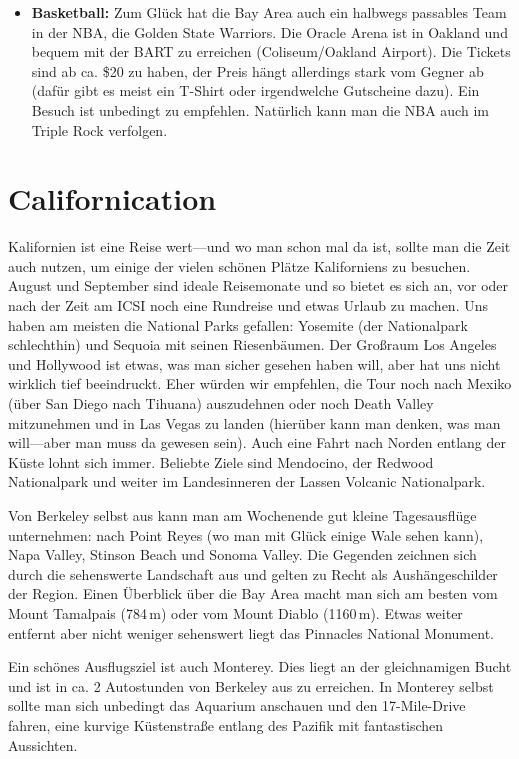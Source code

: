 \documentclass[a4paper]{scrreprt}
\begin{document}
\begin{itemize}
	\item \textbf{Basketball:} Zum Glück hat die Bay Area auch ein halbwegs passables Team in der NBA, die Golden State Warriors. Die Oracle Arena ist in Oakland und bequem mit der BART zu erreichen (Coliseum/Oakland Airport). Die Tickets sind ab ca. \$20 zu haben, der Preis hängt allerdings stark vom Gegner ab (dafür gibt es meist ein T-Shirt oder irgendwelche Gutscheine dazu). Ein Besuch ist unbedingt zu empfehlen. Natürlich kann man die NBA auch im Triple Rock verfolgen.

\end{itemize}

\section{Californication}

Kalifornien ist eine Reise wert---und wo man schon mal da ist, sollte man die Zeit auch nutzen, um einige der vielen schönen Plätze Kaliforniens zu besuchen. August und September sind ideale Reisemonate und so bietet es sich an, vor oder nach der Zeit am ICSI noch eine Rundreise und etwas Urlaub zu machen. Uns haben am meisten die National Parks gefallen: Yosemite (der Nationalpark schlechthin) und Sequoia mit seinen Riesenbäumen. Der Großraum Los Angeles und Hollywood ist etwas, was man sicher gesehen haben will, aber hat uns nicht wirklich tief beeindruckt. Eher würden wir empfehlen, die Tour noch nach Mexiko (über San Diego nach Tihuana) auszudehnen oder noch Death Valley mitzunehmen und in Las Vegas zu landen (hierüber kann man denken, was man will---aber man muss da gewesen sein). Auch eine Fahrt nach Norden entlang der Küste lohnt sich immer. Beliebte Ziele sind Mendocino, der Redwood Nationalpark und weiter im Landesinneren der Lassen Volcanic Nationalpark.

Von Berkeley selbst aus kann man am Wochenende gut kleine Tagesausflüge unternehmen: nach Point Reyes (wo man mit Glück einige Wale sehen kann), Napa Valley, Stinson Beach und Sonoma Valley. Die Gegenden zeichnen sich durch die sehenswerte Landschaft aus und gelten zu Recht als Aushängeschilder der Region. Einen Überblick über die Bay Area macht man sich am besten vom Mount Tamalpais (784\,m) oder vom Mount Diablo (1160\,m).
Etwas weiter entfernt aber nicht weniger sehenswert liegt das Pinnacles National Monument. 

Ein schönes Ausflugsziel ist auch Monterey. Dies liegt an der gleichnamigen Bucht und ist in ca. 2 Autostunden von Berkeley aus zu erreichen. In Monterey selbst sollte man sich unbedingt das Aquarium anschauen und den 17-Mile-Drive fahren, eine kurvige Küstenstraße entlang des Pazifik mit fantastischen Aussichten.
\end{document}
